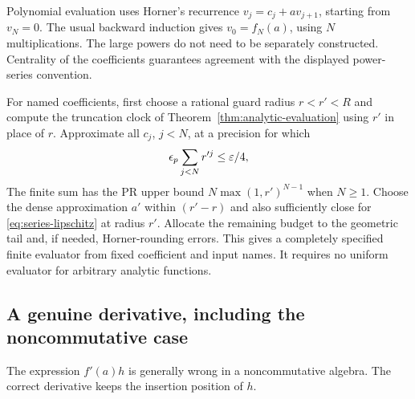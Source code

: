 Polynomial evaluation uses Horner's recurrence
$v_j=c_j+av_{j+1}$, starting from $v_N=0$. The usual backward induction gives $v_0=f_N(a)$, using $N$ multiplications. The large powers do not need to be separately constructed. Centrality of the coefficients guarantees agreement with the displayed power-series convention.

For named coefficients, first choose a rational guard radius $r<r'<R$ and compute the truncation clock of Theorem~\ref{thm:analytic-evaluation} using $r'$ in place of $r$. Approximate all $c_j$, $j<N$, at a precision for which
\[
 \epsilon_p\sum_{j<N}r'^j\le\varepsilon/4,
\]
The finite sum has the PR upper bound $N\max(1,r')^{N-1}$ when $N\ge1$. Choose the dense approximation $a'$ within $(r'-r)$ and also sufficiently close for \eqref{eq:series-lipschitz} at radius $r'$. Allocate the remaining budget to the geometric tail and, if needed, Horner-rounding errors. This gives a completely specified finite evaluator from fixed coefficient and input names. It requires no uniform evaluator for arbitrary analytic functions.

\subsection{A genuine derivative, including the noncommutative case}

The expression $f'(a)h$ is generally wrong in a noncommutative algebra. The correct derivative keeps the insertion position of $h$.

